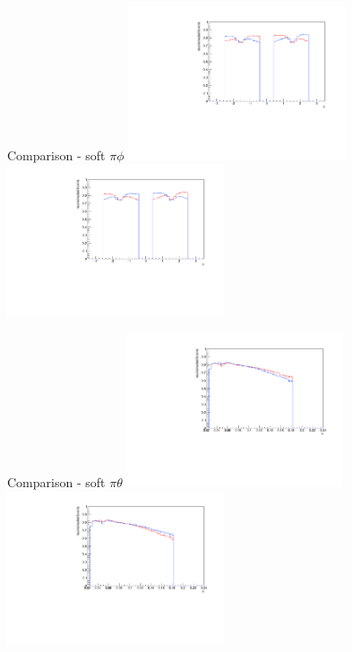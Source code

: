 \documentclass[11pt]{beamer}
\begin{document}
\begin{frame}{Comparison - soft $\pi \phi$}
\centering
\includegraphics[width=0.48\textwidth]{first/up_pdf/combined/h_phi_reco_SPi.pdf}
\includegraphics[width=0.48\textwidth]{first/down_pdf/combined/h_phi_reco_SPi.pdf}
\end{frame}
\begin{frame}{Comparison - soft $\pi \theta$}
\centering
\includegraphics[width=0.48\textwidth]{first/up_pdf/combined/h_theta_reco_SPi.pdf}
\includegraphics[width=0.48\textwidth]{first/down_pdf/combined/h_theta_reco_SPi.pdf}
\end{frame}
\end{document}
